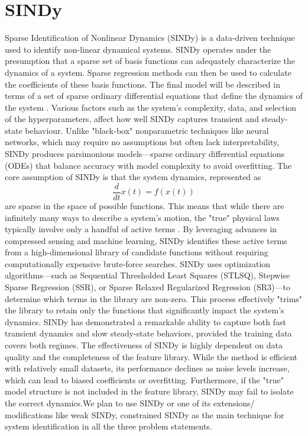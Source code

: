 \documentclass{article}
\begin{document}
\section{SINDy}
Sparse Identification of Nonlinear Dynamics (SINDy) is a data-driven technique used to identify non-linear dynamical systems. SINDy operates under the presumption that a sparse set of basis functions can adequately characterize the dynamics of a system. Sparse regression methods can then be used to calculate the coefficients of these basis functions. The final model will be described in terms of a set of sparse ordinary differential equations that define the dynamics of the system \cite{pandey2024data}. Various factors such as the system’s complexity, data, and selection of the hyperparameters, affect how well SINDy captures transient and steady-state behaviour. Unlike "black-box" nonparametric techniques like neural networks, which may require no assumptions but often lack interpretability, SINDy produces parsimonious models—sparse ordinary differential equations (ODEs) that balance accuracy with model complexity to avoid overfitting. The core assumption of SINDy is that the system dynamics, represented as
\[
\frac{d}{dt} x(t) = f(x(t))
\]
are sparse in the space of possible functions. This means that while there are infinitely many ways to describe a system's motion, the "true" physical laws typically involve only a handful of active terms \cite{brunton2016discovering}. By leveraging advances in compressed sensing and machine learning, SINDy identifies these active terms from a high-dimensional library of candidate functions without requiring computationally expensive brute-force searches. SINDy uses optimization algorithms—such as Sequential Thresholded Least Squares (STLSQ), Stepwise Sparse Regression (SSR), or Sparse Relaxed Regularized Regression (SR3)—to determine which terms in the library are non-zero. This process effectively "trims" the library to retain only the functions that significantly impact the system's dynamics. SINDy has demonstrated a remarkable ability to capture both fast transient dynamics and slow steady-state behaviors, provided the training data covers both regimes. The effectiveness of SINDy is highly dependent on data quality and the completeness of the feature library. While the method is efficient with relatively small datasets, its performance declines as noise levels increase, which can lead to biased coefficients or overfitting. Furthermore, if the "true" model structure is not included in the feature library, SINDy may fail to isolate the correct dynamics.We plan to use SINDy or one of its extensions/ modifications like weak SINDy, constrained SINDy as the main technique for system identification in all the three problem statements.
\end{document}
